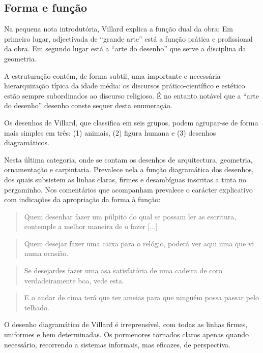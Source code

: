\documentclass{article}
\begin{document}
\subsection{Forma e função}

Na pequena nota introdutória, Villard explica a função dual da obra:
Em primeiro lugar, adjectivada de ``grande arte'' está a função
prática e profissional da obra. Em segundo lugar está a ``arte do
desenho'' que serve a disciplina da geometria.

A estruturação contém, de forma subtil, uma importante e necessária
hierarquização típica da idade média: os discursos prático-científico
e estético estão sempre subordinados ao discurso religioso. É no
entanto notável que a ``arte do desenho'' desenho conste sequer desta
enumeração.

Os desenhos de Villard, que \cite{teresa} classifica em seis grupos,
podem agrupar-se de forma mais simples em três: (1) animais, (2)
figura humana e (3) desenhos diagramáticos.

Nesta última categoria, onde se contam os desenhos de arquitectura,
geometria, ornamentação e carpintaria. Prevalece nela a função
diagramática dos desenhos, dos quais subsistem as linhas claras,
firmes e desambíguas inscritas a tinta no pergaminho. Nos comentários
que acompanham prevalece o carácter explicativo com indicações da
apropriação da forma à função:

\begin{quote}
  Quem desenhar fazer um púlpito do qual se possam ler as escritura,
  contemple a melhor maneira de o fazer [...]  \cite{villard, p??}
\end{quote}

\begin{quote}
  Quem desejar fazer uma caixa para o relógio, poderá ver aqui uma
  que vi numa ocasião. \cite{villard, p??}
\end{quote}

\begin{quote} Se desejardes fazer uma asa satisfatória de uma cadeira
de coro verdadeiramente boa, vede esta. \cite{villard, p??}
\end{quote}

\begin{quote} E o andar de cima terá que ter ameias para que ninguém
  possa passar pelo telhado. \cite{villard, p??}
\end{quote}

O desenho diagramático de Villard é irreprensível, com todas as linhas
firmes, uniformes e bem determinadas. Os pormenores tornados claros
apenas quando necessário, recorrendo a sistemas informais, mas
eficazes, de perspectiva.
\end{document}
